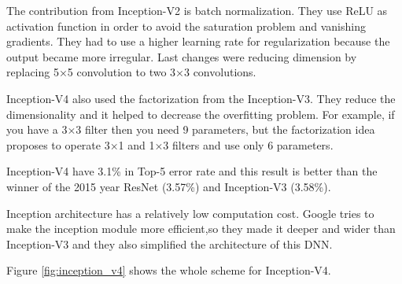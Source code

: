 \documentclass[titlepage]{report}
\begin{document}
The contribution from Inception-V2 is batch normalization. They use ReLU as activation function in order to avoid the saturation problem and vanishing gradients. They had to use a higher learning rate for regularization because the output became more irregular. Last changes were reducing dimension by replacing  5×5 convolution to two 3×3 convolutions. 

Inception-V4 also used the factorization from the Inception-V3. They reduce the dimensionality and it helped to decrease the overfitting problem. For example, if you have a 3×3 filter then you need 9 parameters, but the factorization idea proposes to operate  3×1 and  1×3 filters and use only 6 parameters. 

Inception-V4 have 3.1\% in Top-5 error rate and this result is better than the winner of the 2015 year ResNet (3.57\%) and  Inception-V3 (3.58\%). 

Inception architecture has a relatively low computation cost. Google tries to make the inception module more efficient,so they made it deeper and wider than Inception-V3 and they also simplified the architecture of this DNN.

Figure \ref{fig:inception_v4} shows the whole scheme for Inception-V4.
\end{document}
